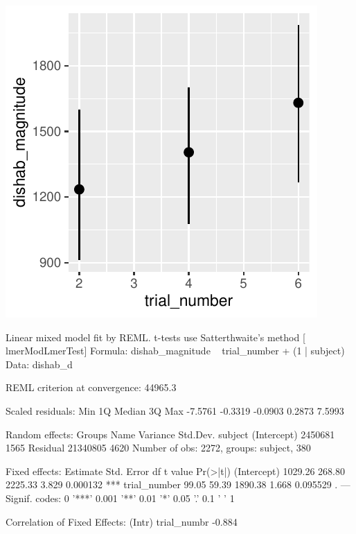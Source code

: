 \documentclass[10pt, letterpaper]{article}
\newenvironment{CodeChunk}{}{}
\begin{document}
\begin{CodeChunk}

\includegraphics{figs/unnamed-chunk-10-1} \begin{CodeOutput}
Linear mixed model fit by REML. t-tests use Satterthwaite's method [
lmerModLmerTest]
Formula: dishab_magnitude ~ trial_number + (1 | subject)
   Data: dishab_d

REML criterion at convergence: 44965.3

Scaled residuals: 
    Min      1Q  Median      3Q     Max 
-7.5761 -0.3319 -0.0903  0.2873  7.5993 

Random effects:
 Groups   Name        Variance Std.Dev.
 subject  (Intercept)  2450681 1565    
 Residual             21340805 4620    
Number of obs: 2272, groups:  subject, 380

Fixed effects:
             Estimate Std. Error      df t value Pr(>|t|)    
(Intercept)   1029.26     268.80 2225.33   3.829 0.000132 ***
trial_number    99.05      59.39 1890.38   1.668 0.095529 .  
---
Signif. codes:  0 '***' 0.001 '**' 0.01 '*' 0.05 '.' 0.1 ' ' 1

Correlation of Fixed Effects:
            (Intr)
trial_numbr -0.884
\end{CodeOutput}
\end{CodeChunk}
\end{document}
